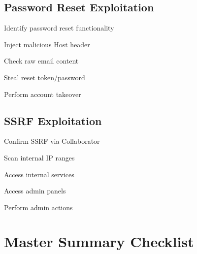 \documentclass[12pt,a4paper]{article}
\begin{document}
\subsection{Password Reset Exploitation}
\begin{checklistbox}
 Identify password reset functionality
\end{checklistbox}
\begin{checklistbox}
 Inject malicious Host header
\end{checklistbox}
\begin{checklistbox}
 Check raw email content
\end{checklistbox}
\begin{checklistbox}
 Steal reset token/password
\end{checklistbox}
\begin{checklistbox}
 Perform account takeover
\end{checklistbox}

\subsection{SSRF Exploitation}
\begin{checklistbox}
 Confirm SSRF via Collaborator
\end{checklistbox}
\begin{checklistbox}
 Scan internal IP ranges
\end{checklistbox}
\begin{checklistbox}
 Access internal services
\end{checklistbox}
\begin{checklistbox}
 Access admin panels
\end{checklistbox}
\begin{checklistbox}
 Perform admin actions
\end{checklistbox}



\section{Master Summary Checklist}
\end{document}
